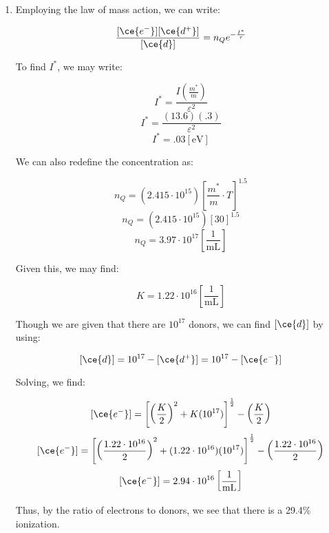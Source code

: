 \begin{enumerate}
\begin{enumerate}
    \end{enumerate}

  \item

    Employing the law of mass action, we can write:

    $$\frac{[\ce{e^-}][\ce{d^+}]}{[\ce{d}]}=n_Qe^{-\frac{I^*}{\tau}}$$

    To find $I^*$, we may write:

    $$I^*=\frac{I\left( \frac{m^*}{m} \right)}{\varepsilon^2}$$
    $$I^*=\frac{(13.6)(.3)}{\varepsilon^2}$$
    $$I^*=.03[\si{\eV}]$$

    We can also redefine the concentration as:

    $$n_Q=\left( 2.415\cdot10^{15} \right)\left[ \frac{m^*}{m}\cdot T \right]^{1.5}$$
    $$n_Q=\left( 2.415\cdot10^{15} \right)\left[ 30 \right]^{1.5}$$
    $$n_Q=3.97\cdot10^{17}\left[ \frac{1}{\si{\milli\liter}} \right]$$

    Given this, we may find:

    $$K=1.22\cdot10^{16}\left[ \frac{1}{\si{\milli\liter}} \right]$$

    Though we are given that there are $10^{17}$ donors, we can find $[\ce{d}]$ by using:

    $$[\ce{d}]=10^{17}-[\ce{d^+}]=10^{17}-[\ce{e^-}]$$

    Solving, we find:

    $$[\ce{e^-}]=\left[ \left( \frac{K}{2} \right)^2+K(10^{17}) \right]^{\frac{1}{2}}-\left( \frac{K}{2} \right)$$
    $$[\ce{e^-}]=\left[ \left( \frac{1.22\cdot10^{16}}{2} \right)^2+(1.22\cdot10^{16})(10^{17}) \right]^{\frac{1}{2}}-\left( \frac{1.22\cdot10^{16}}{2} \right)$$
    $$[\ce{e^-}]=2.94\cdot10^{16}\left[ \frac{1}{\si{\milli\liter}} \right]$$

    Thus, by the ratio of electrons to donors, we see that there is a 29.4\% ionization.

\end{enumerate}




